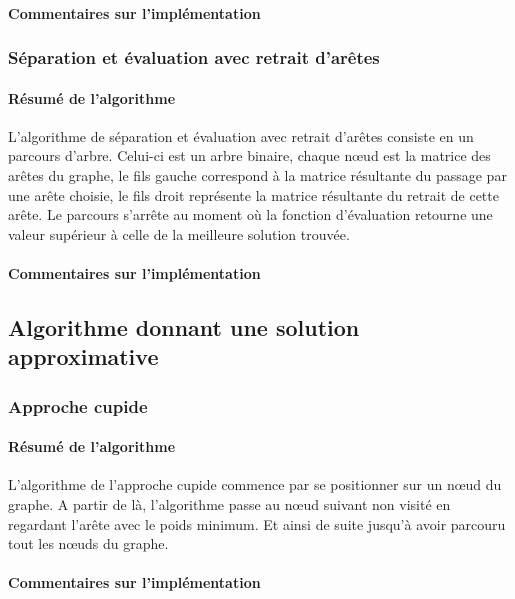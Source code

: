\documentclass[10pt,a4paper]{report}
\begin{document}
		\paragraph{Commentaires sur l'implémentation}
		
		
		
		\subsubsection{Séparation et évaluation avec retrait d'arêtes}		
		
		\paragraph{Résumé de l'algorithme}
		L'algorithme de séparation et évaluation avec retrait d'arêtes consiste en un parcours d'arbre. Celui-ci est un arbre binaire, chaque nœud est la matrice des arêtes du graphe, le fils gauche correspond à la matrice résultante du passage par une arête choisie, le fils droit représente la matrice résultante du retrait de cette arête. Le parcours s'arrête au moment où la fonction d'évaluation retourne une valeur supérieur à celle de la meilleure solution trouvée.\\
		
		\paragraph{Commentaires sur l'implémentation}		
		
		
	\subsection{Algorithme donnant une solution approximative}
	
		\subsubsection{Approche cupide}
		
		\paragraph{Résumé de l'algorithme}
		L'algorithme de l'approche cupide commence par se positionner sur un nœud du graphe. A partir de là, l'algorithme passe au nœud suivant non visité en regardant l'arête avec le poids minimum. Et ainsi de suite jusqu'à avoir parcouru tout les nœuds du graphe.
		
		\paragraph{Commentaires sur l'implémentation}
		
\end{document}
